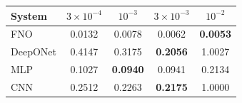 \begin{tabular}{lcccc}
\toprule
System & $3\!\times\!10^{-4}$ & $10^{-3}$ & $3\!\times\!10^{-3}$ & $10^{-2}$ \\
\midrule
FNO & 0.0132 & 0.0078 & 0.0062 & \textbf{0.0053} \\
DeepONet & 0.4147 & 0.3175 & \textbf{0.2056} & 1.0027 \\
MLP & 0.1027 & \textbf{0.0940} & 0.0941 & 0.2134 \\
CNN & 0.2512 & 0.2263 & \textbf{0.2175} & 1.0000 \\
\bottomrule
\end{tabular}
